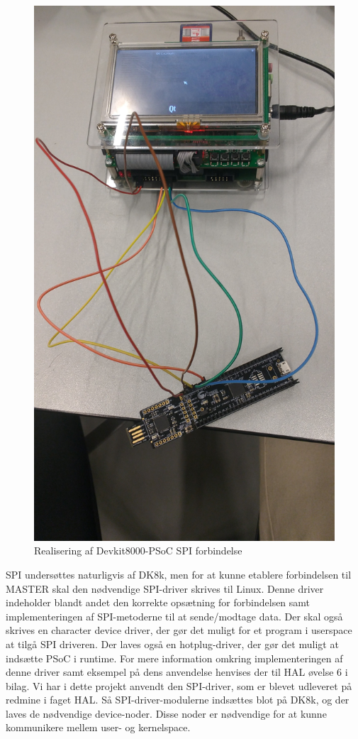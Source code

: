\begin{figure}[H]
	\centering
\includegraphics[scale=0.1]{Screenshots/Realisering_devkit_psoc}
\caption{Realisering af Devkit8000-PSoC SPI forbindelse}
\end{figure}

SPI undersøttes naturligvis af DK8k, men for at kunne etablere forbindelsen til MASTER skal den nødvendige SPI-driver skrives til Linux. 
Denne driver indeholder blandt andet den korrekte opsætning for forbindelsen samt implementeringen af SPI-metoderne til at sende/modtage data.
Der skal også skrives en character device driver, der gør det muligt for et program i userspace at tilgå SPI driveren. Der laves også en hotplug-driver,
der gør det muligt at indsætte PSoC i runtime. For mere information omkring implementeringen af denne driver samt eksempel på dens anvendelse henvises der til HAL 
øvelse 6 i bilag.
Vi har i dette projekt anvendt den SPI-driver, som er blevet udleveret på redmine i faget HAL. Så SPI-driver-modulerne indsættes blot på DK8k, og der 
laves de nødvendige device-noder. Disse noder er nødvendige for at kunne kommunikere mellem user- og kernelspace. 

